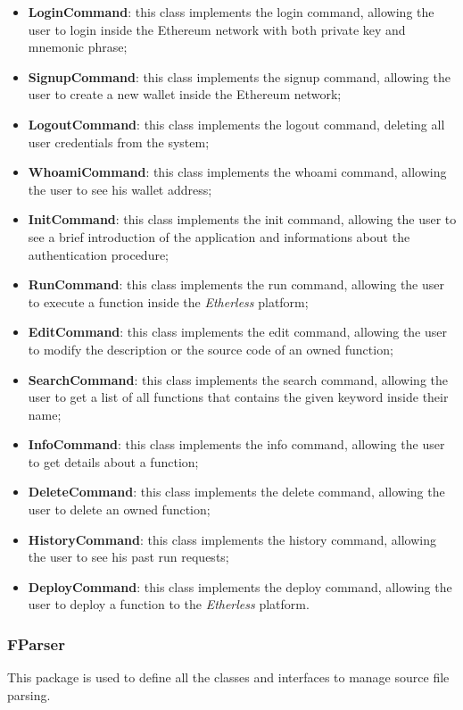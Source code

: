 			\begin{itemize}
				\item \textbf{LoginCommand}: this class implements the login command, allowing the user to login inside the Ethereum network with both private key and mnemonic phrase; 
				\item \textbf{SignupCommand}: this class implements the signup command, allowing the user to create a new wallet inside the Ethereum network; 
				\item \textbf{LogoutCommand}: this class implements the logout command, deleting all user credentials from the system;  
				\item \textbf{WhoamiCommand}: this class implements the whoami command, allowing the user to see his wallet address; 
				\item \textbf{InitCommand}: this class implements the init command, allowing the user to see a brief introduction of the application and informations about the authentication procedure; 
				\item \textbf{RunCommand}: this class implements the run command, allowing the user to execute a function inside the \textit{Etherless} platform; 
				\item \textbf{EditCommand}: this class implements the edit command, allowing the user to modify the description or the source code of an owned function; 
				\item \textbf{SearchCommand}: this class implements the search command, allowing the user to get a list of all functions that contains the given keyword inside their name; 
				\item \textbf{InfoCommand}: this class implements the info command, allowing the user to get details about a function; 
				\item \textbf{DeleteCommand}: this class implements the delete command, allowing the user to delete an owned function; 
				\item \textbf{HistoryCommand}: this class implements the history command, allowing the user to see his past run requests;
				\item \textbf{DeployCommand}: this class implements the deploy command, allowing the user to deploy a function to the \textit{Etherless} platform.
			\end{itemize}
		
		\subsubsection{FParser}
 		This package is used to define all the classes and interfaces to manage source file parsing.
		
